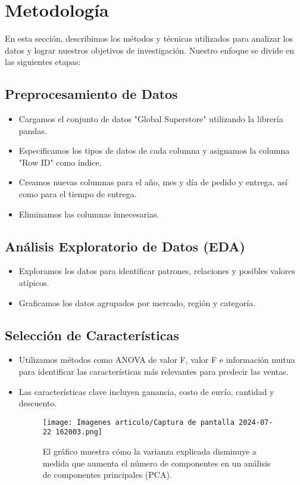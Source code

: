 \documentclass[preprint,12pt]{elsarticle}
\begin{document}
\section{Metodología}
En esta sección, describimos los métodos y técnicas utilizados para analizar los datos y lograr nuestros objetivos de investigación. Nuestro enfoque se divide en las siguientes etapas:

\subsection{Preprocesamiento de Datos}
\begin{itemize}
    \item Cargamos el conjunto de datos "Global Superstore" utilizando la librería pandas.
    \item Especificamos los tipos de datos de cada columna y asignamos la columna "Row ID" como índice.
    \item Creamos nuevas columnas para el año, mes y día de pedido y entrega, así como para el tiempo de entrega.
    \item Eliminamos las columnas innecesarias.
\end{itemize}

\subsection{Análisis Exploratorio de Datos (EDA)}
\begin{itemize}
    \item Exploramos los datos para identificar patrones, relaciones y posibles valores atípicos.
    \item Graficamos los datos agrupados por mercado, región y categoría.
\end{itemize}

\subsection{Selección de Características}
\begin{itemize}
    \item Utilizamos métodos como ANOVA de valor F, valor F e información mutua para identificar las características más relevantes para predecir las ventas.
    \item Las características clave incluyen ganancia, costo de envío, cantidad y descuento.

\begin{figure}[h]
    \centering
    \texttt{[image: Imagenes articulo/Captura de pantalla 2024-07-22 162003.png]} 
    \caption{El gráfico muestra cómo la varianza explicada disminuye a medida que aumenta el número de componentes en un análisis de componentes principales (PCA).}
    \label{fig:qqplot_profit}
\end{figure}
\end{itemize}
\end{document}
